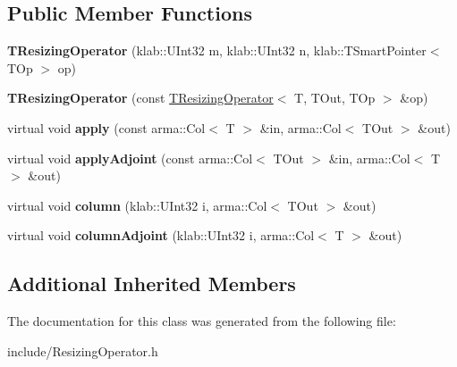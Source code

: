 \subsection*{Public Member Functions}
\begin{DoxyCompactItemize}
\item 
{\bfseries T\+Resizing\+Operator} (klab\+::\+U\+Int32 m, klab\+::\+U\+Int32 n, klab\+::\+T\+Smart\+Pointer$<$ T\+Op $>$ op)\hypertarget{classkl1p_1_1TResizingOperator_aa981eab57535c420540aab538a449f5d}{}\label{classkl1p_1_1TResizingOperator_aa981eab57535c420540aab538a449f5d}

\item 
{\bfseries T\+Resizing\+Operator} (const \hyperlink{classkl1p_1_1TResizingOperator}{T\+Resizing\+Operator}$<$ T, T\+Out, T\+Op $>$ \&op)\hypertarget{classkl1p_1_1TResizingOperator_a72e42873463f4a03a5bd160b4934ed49}{}\label{classkl1p_1_1TResizingOperator_a72e42873463f4a03a5bd160b4934ed49}

\item 
virtual void {\bfseries apply} (const arma\+::\+Col$<$ T $>$ \&in, arma\+::\+Col$<$ T\+Out $>$ \&out)\hypertarget{classkl1p_1_1TResizingOperator_a759101a27c9d0385e578e74aee0f2f8e}{}\label{classkl1p_1_1TResizingOperator_a759101a27c9d0385e578e74aee0f2f8e}

\item 
virtual void {\bfseries apply\+Adjoint} (const arma\+::\+Col$<$ T\+Out $>$ \&in, arma\+::\+Col$<$ T $>$ \&out)\hypertarget{classkl1p_1_1TResizingOperator_ac89d7811e7cff0d7d86d794d90dbc06e}{}\label{classkl1p_1_1TResizingOperator_ac89d7811e7cff0d7d86d794d90dbc06e}

\item 
virtual void {\bfseries column} (klab\+::\+U\+Int32 i, arma\+::\+Col$<$ T\+Out $>$ \&out)\hypertarget{classkl1p_1_1TResizingOperator_ae2306c416721e0018f15b160ea5c4086}{}\label{classkl1p_1_1TResizingOperator_ae2306c416721e0018f15b160ea5c4086}

\item 
virtual void {\bfseries column\+Adjoint} (klab\+::\+U\+Int32 i, arma\+::\+Col$<$ T $>$ \&out)\hypertarget{classkl1p_1_1TResizingOperator_aa7244fc6e1fe2b03adc9348cbabcfcd7}{}\label{classkl1p_1_1TResizingOperator_aa7244fc6e1fe2b03adc9348cbabcfcd7}

\end{DoxyCompactItemize}
\subsection*{Additional Inherited Members}


The documentation for this class was generated from the following file\+:\begin{DoxyCompactItemize}
\item 
include/Resizing\+Operator.\+h\end{DoxyCompactItemize}
